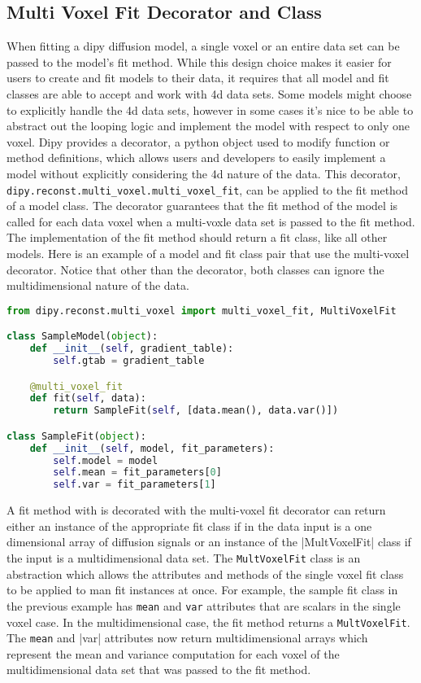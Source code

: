 \subsection{Multi Voxel Fit Decorator and Class}

When fitting a dipy diffusion model, a single voxel or an entire data set can be passed to the model's fit method. While this design choice makes it easier for users to create and fit models to their data, it requires that all model and fit classes are able to accept and work with 4d data sets. Some models might choose to explicitly handle the 4d data sets, however in some cases it's nice to be able to abstract out the looping logic and implement the model with respect to only one voxel. Dipy provides a decorator, a python object used to modify function or method definitions, which allows users and developers to easily implement a model without explicitly considering the 4d nature of the data. This decorator, \verb|dipy.reconst.multi_voxel.multi_voxel_fit|, can be applied to the fit method of a model class. The decorator guarantees that the fit method of the model is called for each data voxel when a multi-voxle data set is passed to the fit method. The implementation of the fit method should return a fit class, like all other models. Here is an example of a model and fit class pair that use the multi-voxel decorator. Notice that other than the decorator, both classes can ignore the multidimensional nature of the data.

\begin{lstlisting}[language=python]
from dipy.reconst.multi_voxel import multi_voxel_fit, MultiVoxelFit

class SampleModel(object):
    def __init__(self, gradient_table):
        self.gtab = gradient_table

    @multi_voxel_fit
    def fit(self, data):
        return SampleFit(self, [data.mean(), data.var()])

class SampleFit(object):
    def __init__(self, model, fit_parameters):
        self.model = model
        self.mean = fit_parameters[0]
        self.var = fit_parameters[1]
\end{lstlisting}

A fit method with is decorated with the multi-voxel fit decorator can return either an instance of the appropriate fit class if in the data input is a one dimensional array of diffusion signals or an instance of the \varb|MultVoxelFit| class if the input is a multidimensional data set. The \verb|MultVoxelFit| class is an abstraction which allows the attributes and methods of the single voxel fit class to be applied to man fit instances at once. For example, the sample fit class in the previous example has \verb|mean| and \verb|var| attributes that are scalars in the single voxel case. In the multidimensional case, the fit method returns a \verb|MultVoxelFit|. The \verb|mean| and \var|var| attributes now return multidimensional arrays which represent the mean and variance computation for each voxel of the multidimensional data set that was passed to the fit method.

